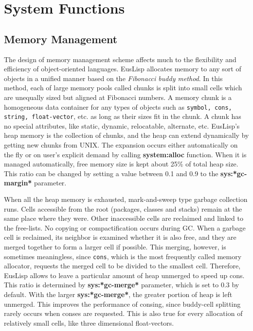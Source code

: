 \section{System Functions}

\subsection{Memory Management}
The design of  memory management scheme affects much to the flexibility and
efficiency of object-oriented languages.
EusLisp allocates memory to any sort of objects
in a unified manner based on the {\em Fibonacci buddy method}.
In this method, each of large memory pools called chunks is split into
small cells which are unequally sized but aligned at Fibonacci numbers.
A memory chunk is a homogeneous data container for any types of
objects such as {\tt symbol, cons, string, float-vector}, etc.
as long as their sizes fit in the chunk.
A chunk has no special attributes,
like static, dynamic, relocatable, alternate, etc.
EusLisp's heap memory is the collection of chunks, and 
the heap can extend dynamically by getting new chunks from UNIX.
The expansion occurs either automatically on the fly
or on user's explicit demand by calling {\bf system:alloc} function.
When it is managed automatically, free memory size is kept
about 25\% of total heap size. %
This ratio can be changed by setting a value between 0.1 and 0.9 to
the {\bf sys:*gc-margin*} parameter.

When all the heap memory is exhausted, mark-and-sweep type garbage collection
runs.
Cells accessible from the root (packages, classes and stacks) remain at the
same place where they were.
Other inaccessible cells are reclaimed and linked to the free-lists.
No copying or compactification occurs during GC.
When a garbage cell is reclaimed, its neighbor is examined
whether it is also free,
and they are merged together to form a larger cell if possible.
This merging, however, is sometimes meaningless,
since {\tt cons}, which is the most frequently called memory allocator,
requests the merged cell to be divided to the smallest cell.
Therefore, EusLisp allows to leave a particular amount of heap unmerged to speed up cons.
This ratio is determined by {\bf sys:*gc-merge*} parameter,
which is set to 0.3 by default.
With the larger {\bf sys:*gc-merge*}, the greater portion of  heap is left unmerged.
This improves the performance of consing,
since buddy-cell splitting rarely occurs when conses are requested.
This is also true for every allocation of relatively small cells,
like three dimensional float-vectors.


